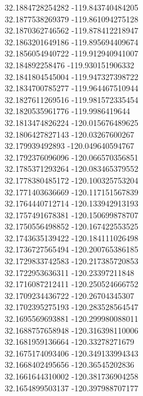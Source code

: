 {32.1884728254282	-119.843740484205\\
32.1877538269379	-119.861094275128\\
32.1870362746562	-119.878412218947\\
32.1863201649186	-119.895694409674\\
32.1856054940722	-119.912940941007\\
32.184892258476	-119.930151906332\\
32.1841804545004	-119.947327398722\\
32.1834700785277	-119.964467510944\\
32.1827611269516	-119.981572335454\\
32.1820535961776	-119.9986419644\\
32.1813474826224	-120.015676489625\\
32.1806427827143	-120.03267600267\\
32.179939492893	-120.049640594767\\
32.1792376096096	-120.066570356851\\
32.1785371293264	-120.083465379552\\
32.1778380485172	-120.100325753204\\
32.1771403636669	-120.117151567839\\
32.1764440712714	-120.133942913193\\
32.1757491678381	-120.150699878707\\
32.1750556498852	-120.167422553525\\
32.1743635139422	-120.184111026498\\
32.1736727565494	-120.200765386185\\
32.1729833742583	-120.217385720853\\
32.1722953636311	-120.23397211848\\
32.1716087212411	-120.250524666752\\
32.1709234436722	-120.26704345307\\
32.1702395275193	-120.283528564547\\
32.1695569693881	-120.299980088011\\
32.1688757658948	-120.316398110006\\
32.1681959136664	-120.33278271679\\
32.1675174093406	-120.349133994343\\
32.1668402495656	-120.36545202836\\
32.1661644310002	-120.381736904258\\
32.1654899503137	-120.397988707177\\
}
